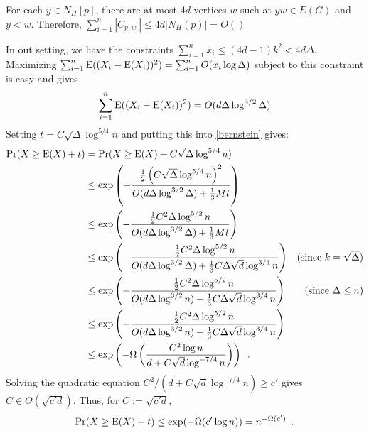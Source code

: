 \documentclass{patmorin}
\begin{document}
For each $y\in N_H[p]$, there are at most $4d$ vertices $w$ such at $yw\in E(G)$ and $y< w$.  Therefore,
$\sum_{i=1}^n |C_{p,w_i}| \le 4d|N_H(p)|= O()$


In out setting, we have the constraints $\sum_{i=1}^n x_i \le (4d-1)k^2 < 4d\Delta$.  Maximizing $\sum_{i=1}^n\mathrm{E}((X_i-\mathrm{E}(X_i))^2)=\sum_{i=1}^n O(x_i\log \Delta)$ subject to this constraint is easy and gives
\[
  \sum_{i=1}^n\mathrm{E}((X_i-\mathrm{E}(X_i))^2) = O(d\Delta\log^{3/2} \Delta)
\]
Setting $t=C\sqrt{\Delta}\log^{5/4} n$ and putting this into \cref{bernstein} gives:
\begin{align*}
  \Pr(X\ge \mathrm{E}(X)+t)
  & = \Pr(X\ge \mathrm{E}(X)+C\sqrt{\Delta}\log^{5/4} n) \\
  & \le \exp \left(-\frac{\tfrac{1}{2}\left(C\sqrt{\Delta}\log^{5/4} n\right)^2}{O(d\Delta\log^{3/2}\Delta) + \tfrac{1}{3}Mt}\right) \\
  & \le \exp \left(-\frac{\tfrac{1}{2}C^2\Delta\log^{5/2} n}{O(d\Delta\log^{3/2}\Delta) + \tfrac{1}{3}Mt}\right) \\
  & \le \exp \left(-\frac{\tfrac{1}{2}C^2\Delta\log^{5/2} n}{O(d\Delta\log^{3/2}\Delta) + \tfrac{1}{3}C\Delta\sqrt{d}\log^{3/4} n}\right) & \text{(since $k=\sqrt{\Delta}$)} \\
  & \le \exp \left(-\frac{\tfrac{1}{2}C^2\Delta\log^{5/2} n}{O(d\Delta\log^{3/2} n) + \tfrac{1}{3}C\Delta\sqrt{d}\log^{3/4} n}\right)
  & \text{(since $\Delta \le n$)} \\
  & \le \exp \left(-\frac{\tfrac{1}{2}C^2\Delta\log^{5/2} n}{O(d\Delta\log^{3/2} n) + \tfrac{1}{3}C\Delta\sqrt{d}\log^{3/4} n}\right) \\
  & \le \exp \left(-\Omega\left(\frac{C^2\log n}{d + C\sqrt{d}\log^{-7/4} n}\right)\right) \enspace .
\end{align*}
Solving the quadratic equation $C^2/(d+C\sqrt{d}\log^{-7/4} n) \ge c'$ gives $C\in\Theta(\sqrt{c'd})$. Thus, for $C:=\sqrt{c'd}$,
\[
  \Pr(X\ge \mathrm{E}(X)+t) \le \exp(-\Omega(c'\log n)) = n^{-\Omega(c')} \enspace .
\]
\end{document}
